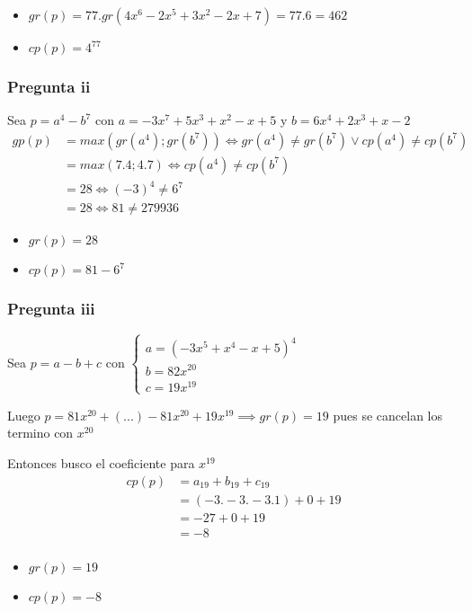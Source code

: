 \begin{itemize}
    \item $ gr(p) = 77 . gr(4x^6-2x^5+3x^2-2x+7) = 77.6 = 462 $
    \item $ cp(p) = 4^{77} $ 
\end{itemize}

\subsubsection{Pregunta ii}

Sea $ p = a^4 - b^7 $ con $ a = -3x^7 + 5x^3 + x^2 - x + 5 $ y $ b = 6x^4 + 2x^3 + x - 2 $
\begin{align*}
    gp(p) &= max(gr(a^4); gr(b^7)) \iff gr(a^4) \neq gr(b^7) \vee cp(a^4) \neq cp(b^7) \\
    &= max(7.4; 4.7) \iff cp(a^4) \neq cp(b^7) \\
    &= 28 \iff (-3)^4 \neq 6^7 \\
    &= 28 \iff 81 \neq 279936
\end{align*}
\begin{itemize}
    \item $ gr(p) = 28 $
    \item $ cp(p) = 81-6^7 $ 
\end{itemize}

\subsubsection{Pregunta iii}

Sea $ p = a - b + c $ con $ \begin{cases}
    a = (-3x^5 + x^4 - x + 5)^4 \\
    b = 82x^{20} \\
    c = 19x^{19}
\end{cases} $

Luego $ p = 81x^{20} + (...) - 81x^{20}+19x^{19} \implies gr(p) = 19 $ pues se cancelan los termino con $ x^{20} $

Entonces busco el coeficiente para $ x^{19} $
\begin{align*}
    cp(p) &= a_{19} + b_{19} + c_{19} \\
    &= (-3.-3.-3.1) + 0 + 19 \\
    &= -27 + 0 + 19 \\
    &= -8 \\
\end{align*}
\begin{itemize}
    \item $ gr(p) = 19 $
    \item $ cp(p) = -8 $ 
\end{itemize}


